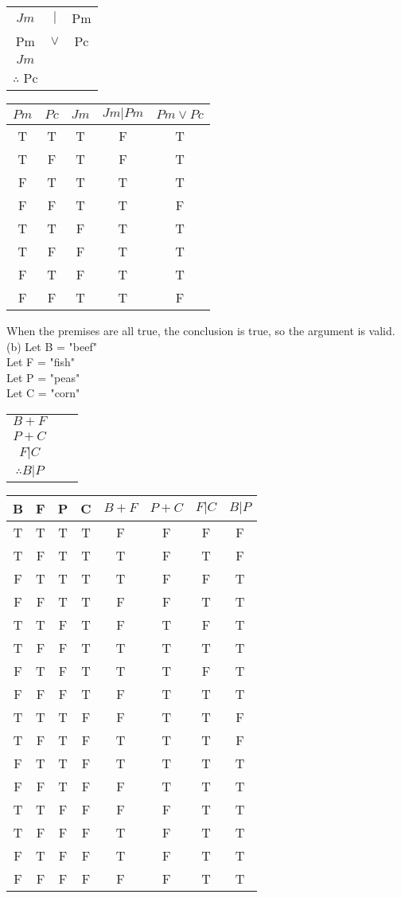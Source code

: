 \documentclass{article}
\begin{document}
\begin{tabular}{ccc}
$Jm$&$|$&Pm\\
Pm&$\vee$&Pc\\
$Jm$&&\\
\hline
$\therefore$ Pc
\end{tabular}
\vspace{2em}
\linebreak
\begin{tabular}{c|c|c|c|c}
$Pm$&$Pc$&$Jm$&$Jm | Pm$&$Pm \vee Pc$\\
\hline
T&T&T&F&T\\
T&F&T&F&T\\
F&T&T&T&T\\
F&F&T&T&F\\
T&T&F&T&T\\
T&F&F&T&T\\
F&T&F&T&T\\
F&F&T&T&F\\
\end{tabular}
\vspace{2em}
\linebreak
When the premises are all true, the conclusion is true, so the argument is valid.\\
\linebreak
(b) Let B = "beef"\\
 Let F = "fish"\\
 Let P = "peas"\\
 Let C = "corn"\\
 \begin{tabular}{ccc}
 $B + F$\\
 $P + C$\\
 $F | C$\\
 \hline
 $\therefore B | P$\\
 \end{tabular}
 \vspace{2em}
 \linebreak
 \begin{tabular}{cccccccc}
 B&F&P&C&$B + F$&$P + C$&$F | C$&$B | P$\\
 \hline
 T&T&T&T&F&F&F&F\\
 T&F&T&T&T&F&T&F\\
 F&T&T&T&T&F&F&T\\
 F&F&T&T&F&F&T&T\\
 T&T&F&T&F&T&F&T\\
 T&F&F&T&T&T&T&T\\
 F&T&F&T&T&T&F&T\\
 F&F&F&T&F&T&T&T\\
 T&T&T&F&F&T&T&F\\
 T&F&T&F&T&T&T&F\\
 F&T&T&F&T&T&T&T\\
 F&F&T&F&F&T&T&T\\
 T&T&F&F&F&F&T&T\\
 T&F&F&F&T&F&T&T\\
 F&T&F&F&T&F&T&T\\
 F&F&F&F&F&F&T&T\\
 \end{tabular}
\end{document}
